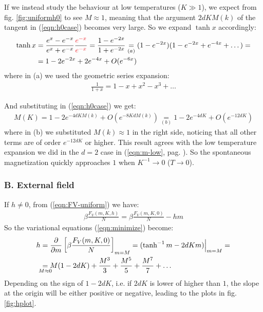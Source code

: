 \documentclass[../../main.tex]{subfiles}
\begin{document}
\medskip

If we instead study the behaviour at low temperatures ($K \gg 1$), we expect from fig. \ref{fig:uniformh0} to see $M \approx 1$, meaning that the argument $2dKM(k)$ of the tangent in (\ref{eqn:h0case}) becomes very large. So we expand $\tanh x$ accordingly:
\begin{align*}
    \tanh x &= \frac{e^x - e^{-x}}{e^x + e^{-x}} \frac{\textcolor{Red}{e^{-x}}}{\textcolor{Red}{e^{-x}}} = \frac{1-e^{-2x}}{1+e^{-2x}} \underset{(a)}{=}  (1-e^{-2x})(1-e^{-2x} + e^{-4x} + \dots) =\\
    &= 1 - 2e^{-2x} + 2e^{-4x} + O(e^{-6x})
\end{align*}
where in (a) we used the geometric series expansion:
\begin{align*}
    \frac{1}{1+x} = 1 - x + x^2 - x^3 + \dots
\end{align*}

And substituting in (\ref{eqn:h0case}) we get:
\begin{align}\label{eqn:low-temeperature-var}
    M(K) = 1-2e^{-4dK M(k)} + O(e^{-8KdM(k)}) \underset{(b)}{=}  1-2e^{-4dK} + O(e^{-12dK})
\end{align}
where in (b) we substituted $M(k) \approx 1$ in the right side, noticing that all other terms are of order $e^{-12dK}$ or higher. This result agrees with the low temperature expansion we did in the $d=2$ case in (\ref{eqn:m-low}, pag. \pageref{eqn:m-low}). So the spontaneous magnetization quickly approaches $1$ when $K^{-1} \to 0$ ($T \to 0$).

\subsubsection{B. External field}
If $h\neq 0$, from (\ref{eqn:FV-uniform}) we have:
\begin{align*}
    \beta \frac{F_V(m, K, h)}{N} = \beta \frac{F_V(m,K,0)}{N} - hm  
\end{align*}
So the variational equations (\ref{eqn:minimize}) become:
\begin{align}\label{eqn:var-eq-h}
    h &= \pdv{m}\left[\beta \frac{F_V(m,K,0)}{N} \right]_{m=M} = (\tanh^{-1} m - 2dKm)\Big|_{m=M} =\\
      &\underset{\mathclap{M \approx 0}}{=}  M(1-2dK) + \frac{M^3}{3} + \frac{M^5}{5} + \frac{M^7}{7} + \dots \nonumber
\end{align}
Depending on the sign of $1-2dK$, i.e. if $2dK$ is lower of higher than $1$, the slope at the origin will be either positive or negative, leading to the plots in fig. \ref{fig:hplot}.
\end{document}
